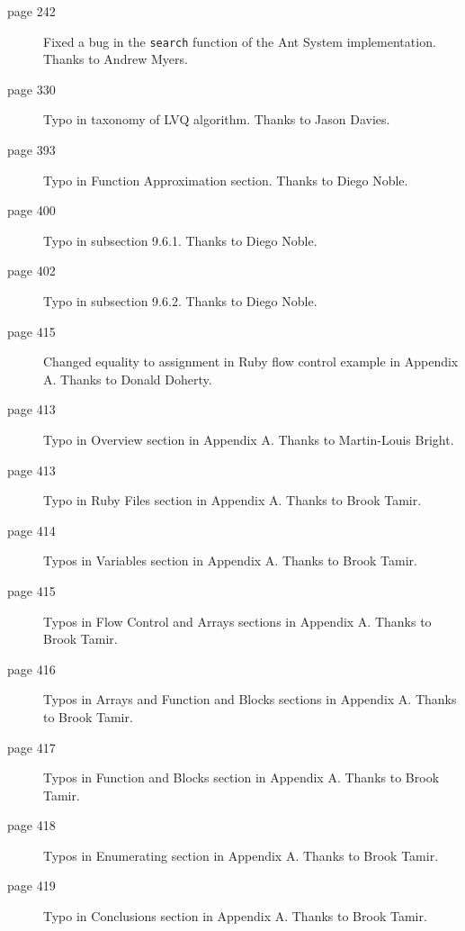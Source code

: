 \begin{small}
\begin{description}
	\item[page 242] Fixed a bug in the \texttt{search} function of the Ant System implementation. Thanks to Andrew Myers.
	\item[page 330] Typo in taxonomy of LVQ algorithm. Thanks to Jason Davies.
	\item[page 393] Typo in Function Approximation section. Thanks to Diego Noble.
	\item[page 400] Typo in subsection 9.6.1. Thanks to Diego Noble.
	\item[page 402] Typo in subsection 9.6.2. Thanks to Diego Noble.
	\item[page 415] Changed equality to assignment in Ruby flow control example in Appendix A. Thanks to Donald Doherty.
	\item[page 413] Typo in Overview section in Appendix A. Thanks to Martin-Louis Bright.
	\item[page 413] Typo in Ruby Files section in Appendix A. Thanks to Brook Tamir.
	\item[page 414] Typos in Variables section in Appendix A. Thanks to Brook Tamir.
	\item[page 415] Typos in Flow Control and Arrays sections in Appendix A. Thanks to Brook Tamir.
	\item[page 416] Typos in Arrays and Function and Blocks sections in Appendix A. Thanks to Brook Tamir.
	\item[page 417] Typos in Function and Blocks section in Appendix A. Thanks to Brook Tamir.
	\item[page 418] Typos in Enumerating section in Appendix A. Thanks to Brook Tamir.
	\item[page 419] Typo in Conclusions section in Appendix A. Thanks to Brook Tamir.
\end{description}

\end{small}

